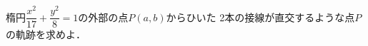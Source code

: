 \documentclass[../../main.tex]{subfiles}
\begin{document}
楕円$\displaystyle \dfrac{x^2}{17}+\dfrac{y^2}{8}=1$の外部の点$P(a,b)$からひいた
2本の接線が直交するような点$P$の軌跡を求めよ．
\end{document}
